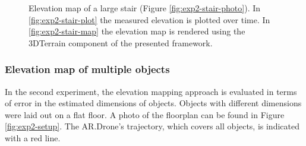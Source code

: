 \begin{figure}[htb!]
  \begin{center}

 \end{center}
  \caption{Elevation map of a large stair (Figure \ref{fig:exp2-stair-photo}). In \ref{fig:exp2-stair-plot} the measured elevation is plotted over time. In \ref{fig:exp2-stair-map} the elevation map is rendered using the 3DTerrain component of the presented framework.}
  \label{fig:exp2-results}
\end{figure}

\subsubsection{Elevation map of multiple objects}

In the second experiment, the elevation mapping approach is evaluated in terms of error in the estimated dimensions of objects.
Objects with different dimensions were laid out on a flat floor.
A photo of the floorplan can be found in Figure \ref{fig:exp2-setup}.
The AR.Drone's trajectory, which covers all objects, is indicated with a red line.

